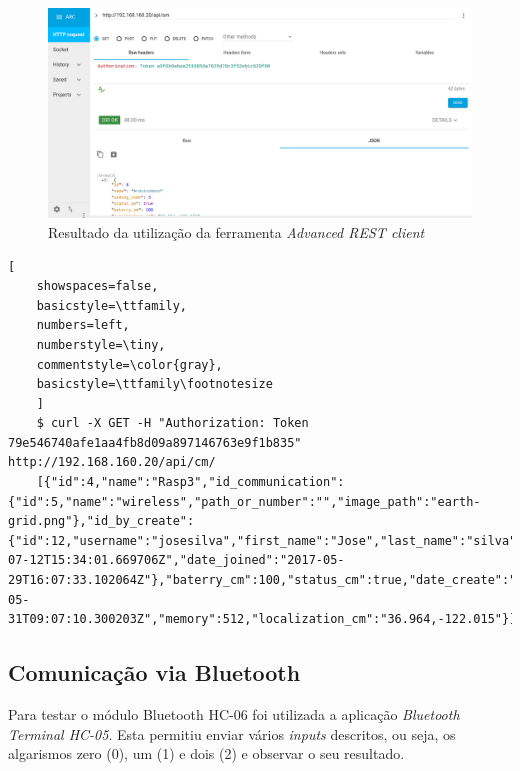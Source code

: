\begin{figure}[h]
	\centering
	\includegraphics[width=0.7\linewidth]{prints-web/API_teste1.png}
	\caption{Resultado da utilização da ferramenta \textit{Advanced REST client}}
	\label{testgrap}
\end{figure}







	\begin{lstlisting}[
	showspaces=false,
	basicstyle=\ttfamily,
	numbers=left,
	numberstyle=\tiny,
	commentstyle=\color{gray},
	basicstyle=\ttfamily\footnotesize
	]
	$ curl -X GET -H "Authorization: Token  79e546740afe1aa4fb8d09a897146763e9f1b835" http://192.168.160.20/api/cm/
	[{"id":4,"name":"Rasp3","id_communication":{"id":5,"name":"wireless","path_or_number":"","image_path":"earth-grid.png"},"id_by_create":{"id":12,"username":"josesilva","first_name":"Jose","last_name":"silva","email":"ruipedrooliveira@ua.pt","last_login":"2017-07-12T15:34:01.669706Z","date_joined":"2017-05-29T16:07:33.102064Z"},"baterry_cm":100,"status_cm":true,"date_create":"2017-05-31T09:07:10.300203Z","memory":512,"localization_cm":"36.964,-122.015"}]
	\end{lstlisting}
	
	


\subsection{Comunicação via Bluetooth }


Para testar o módulo Bluetooth HC-06 foi utilizada a aplicação \textit{Bluetooth Terminal HC-05}. Esta permitiu enviar vários \textit{inputs} descritos, ou seja,  os algarismos zero (0), um (1) e dois (2) e observar o seu resultado.  

